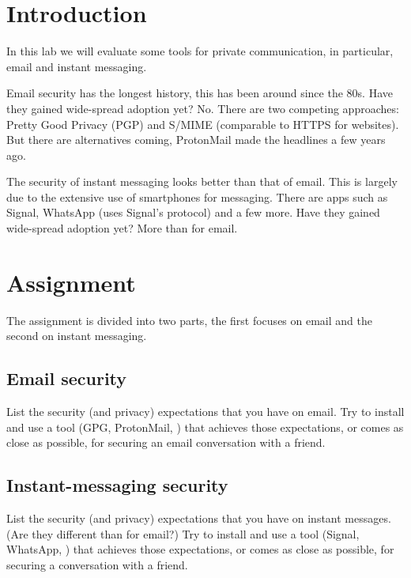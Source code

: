 \mode*

\section{Introduction}%
\label{Introduction}

In this lab we will evaluate some tools for private communication, in 
particular, email and instant messaging.

Email security has the longest history, this has been around since the 80s.
Have they gained wide-spread adoption yet?
No.
There are two competing approaches: Pretty Good Privacy (PGP) and S/MIME 
(comparable to HTTPS for websites).
But there are alternatives coming, \eg ProtonMail made the headlines a few 
years ago.

The security of instant messaging looks better than that of email.
This is largely due to the extensive use of smartphones for messaging.
There are apps such as Signal, WhatsApp (uses Signal's protocol) and a few 
more.
Have they gained wide-spread adoption yet?
More than for email.


\section{Assignment}%
\label{sec:Tasks}

The assignment is divided into two parts, the first focuses on email and the 
second on instant messaging.

\subsection{Email security}

List the security (and privacy) expectations that you have on email.
Try to install and use a tool (\eg GPG, ProtonMail, \etc) that achieves those 
expectations, or comes as close as possible, for securing an email conversation 
with a friend.

\subsection{Instant-messaging security}

List the security (and privacy) expectations that you have on instant messages.
(Are they different than for email?)
Try to install and use a tool (\eg Signal, WhatsApp, \etc) that achieves those 
expectations, or comes as close as possible, for securing a conversation with a 
friend.

